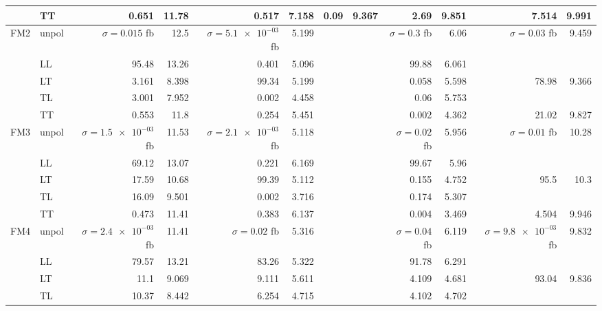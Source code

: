 \begin{table}[H]
{\begin{tabular}{llrrrrrrrrrr}
 & TT & \num{0.651} & \num{11.78} & \num{0.517} & \num{7.158} & \num{0.09} & \num{9.367} & \num{2.69} & \num{9.851} & \num{7.514} & \num{9.991} \\
\midrule
\multirow{5}{*}{FM2}
 & unpol & $\sigma = \num{0.015}$ fb & \num{12.5} & $\sigma = \num{5.1e-03}$ fb & \num{5.199} &  &  & $\sigma = \num{0.3}$ fb & \num{6.06} & $\sigma = \num{0.03}$ fb & \num{9.459} \\
 & LL & \num{95.48} & \num{13.26} & \num{0.401} & \num{5.096} &  &  & \num{99.88} & \num{6.061} &  &  \\
 & LT & \num{3.161} & \num{8.398} & \num{99.34} & \num{5.199} &  &  & \num{0.058} & \num{5.598} & \num{78.98} & \num{9.366} \\
 & TL & \num{3.001} & \num{7.952} & \num{0.002} & \num{4.458} &  &  & \num{0.06} & \num{5.753} &  &  \\
 & TT & \num{0.553} & \num{11.8} & \num{0.254} & \num{5.451} &  &  & \num{0.002} & \num{4.362} & \num{21.02} & \num{9.827} \\
\midrule
\multirow{5}{*}{FM3}
 & unpol & $\sigma = \num{1.5e-03}$ fb & \num{11.53} & $\sigma = \num{2.1e-03}$ fb & \num{5.118} &  &  & $\sigma = \num{0.02}$ fb & \num{5.956} & $\sigma = \num{0.01}$ fb & \num{10.28} \\
 & LL & \num{69.12} & \num{13.07} & \num{0.221} & \num{6.169} &  &  & \num{99.67} & \num{5.96} &  &  \\
 & LT & \num{17.59} & \num{10.68} & \num{99.39} & \num{5.112} &  &  & \num{0.155} & \num{4.752} & \num{95.5} & \num{10.3} \\
 & TL & \num{16.09} & \num{9.501} & \num{0.002} & \num{3.716} &  &  & \num{0.174} & \num{5.307} &  &  \\
 & TT & \num{0.473} & \num{11.41} & \num{0.383} & \num{6.137} &  &  & \num{0.004} & \num{3.469} & \num{4.504} & \num{9.946} \\
\midrule
\multirow{5}{*}{FM4}
 & unpol & $\sigma = \num{2.4e-03}$ fb & \num{11.41} & $\sigma = \num{0.02}$ fb & \num{5.316} &  &  & $\sigma = \num{0.04}$ fb & \num{6.119} & $\sigma = \num{9.8e-03}$ fb & \num{9.832} \\
 & LL & \num{79.57} & \num{13.21} & \num{83.26} & \num{5.322} &  &  & \num{91.78} & \num{6.291} &  &  \\
 & LT & \num{11.1} & \num{9.069} & \num{9.111} & \num{5.611} &  &  & \num{4.109} & \num{4.681} & \num{93.04} & \num{9.836} \\
 & TL & \num{10.37} & \num{8.442} & \num{6.254} & \num{4.715} &  &  & \num{4.102} & \num{4.702} &  &  \\

\end{tabular}}
\end{table}
